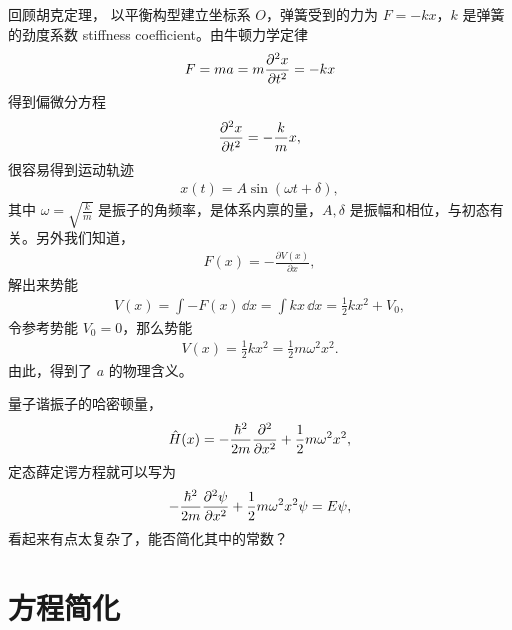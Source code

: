回顾胡克定理，
以平衡构型建立坐标系 $O$，弹簧受到的力为 $F = -kx$，$k$ 是弹簧的劲度系数 stiffness coefficient。由牛顿力学定律
\begin{align}
    F = ma = m \pdv[2]{x}{t} = -k x
\end{align}
得到偏微分方程
\begin{align}
    \pdv[2]{x}{t} = - \frac km x,
\end{align}
很容易得到运动轨迹
\begin{align}
    x(t) = A \sin(\omega t + \delta),
\end{align}
其中 $\omega = \sqrt{\frac{k}m}$ 是振子的角频率，是体系内禀的量，$A,\delta$ 是振幅和相位，与初态有关。另外我们知道，
\begin{align}
    F(x) = -\frac{\partial V(x)}{\partial x}, 
\end{align}
解出来势能
\begin{align}
    V(x) = \int -F(x)\,\dd x = \int kx \, \dd x = \frac12 k x^2 + V_0,
\end{align}
令参考势能 $V_0 = 0$，那么势能
\begin{eqnarray}
    V(x) = \frac 12 kx^2 = \frac 12 m\omega^2 x^2.
\end{eqnarray}
由此，得到了 $a$ 的物理含义。

量子谐振子的哈密顿量，
\begin{align}
    \hat H(x) = -\frac{\hbar^2}{2m} \pdv[2]{x} + \frac 12 m\omega^2 x^2,
\end{align}
定态薛定谔方程就可以写为
\begin{align}
    -\frac{\hbar^2}{2m} \pdv[2]{\psi}{x} + \frac 12 m\omega^2 x^2 \psi = E\psi,
    \label{eq:harm_seq_original}
\end{align}
看起来有点太复杂了，能否简化其中的常数？

\section{方程简化}

